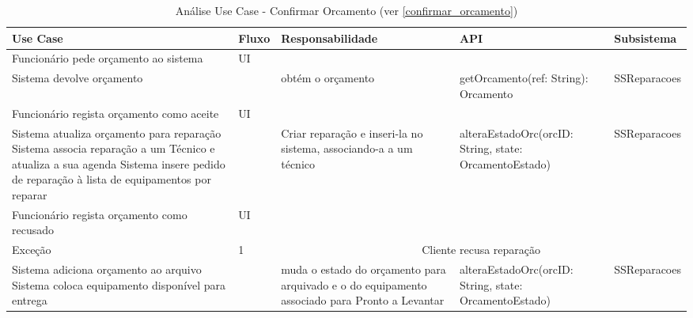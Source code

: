 \documentclass[../relatorio.tex]{subfiles}
\begin{document}
\begin{landscape}
    \begin{table}[!h]
        \centering
        \begin{tabular}{|p{5cm}|p{1cm}|p{4cm}|p{6cm}|p{3cm}|}
            \hline
            \rowcolor{gray!20!white}
            Use Case & Fluxo                                            & Responsabilidade & API & Subsistema \\
            \hline
            \rowcolor{yellow}
            Funcionário pede orçamento ao sistema
                     & UI
                     & 
                     & 
                     & 
            \\
            \hline
            Sistema devolve orçamento
                     & 
                     & obtém o orçamento
                     & getOrcamento(ref: String): Orcamento
                     & SSReparacoes
            \\
            \hline
            \rowcolor{yellow}
            Funcionário regista orçamento como aceite
                     & UI
                     & 
                     & 
                     & 
            \\
            \hline
            Sistema atualiza orçamento para reparação
            Sistema associa reparação a um Técnico e atualiza a sua agenda
            Sistema insere pedido de reparação à lista de equipamentos por reparar
                     & 
                     & Criar reparação e inseri-la no sistema, associando-a a um técnico
                     & alteraEstadoOrc(orcID: String, state: OrcamentoEstado)
                     & SSReparacoes
            \\
            \hline
            \rowcolor{yellow}
            Funcionário regista orçamento como recusado
                     & UI
                     & 
                     & 
                     & 
            \\
            \hline
            \rowcolor{red!30}
            Exceção  & 1                                                 &  \multicolumn{3}{c}{Cliente recusa reparação}\\
            \hline
            Sistema adiciona orçamento ao arquivo
            Sistema coloca equipamento disponível para entrega
                     & 
                     & muda o estado do orçamento para arquivado e o do equipamento associado para Pronto a Levantar
                     & alteraEstadoOrc(orcID: String, state: OrcamentoEstado)
                     & SSReparacoes
            \\
            \hline
        \end{tabular}
        \caption{Análise Use Case - Confirmar Orcamento (ver \ref{confirmar_orcamento})}
    \end{table}
\end{landscape}
\end{document}
